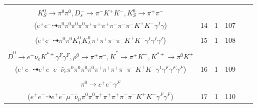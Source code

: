 \documentclass[landscape]{article}
\newcounter{rownumbers}
\newcommand\rn{\stepcounter{rownumbers}\arabic{rownumbers}}
\newcommand{\EOLP}{\\ \hline} %
\newcommand{\topoTags}[1]{#1} %
\begin{document}
\begin{longtable}{clcccc}
\rn & \makecell[l]{ $ 
e^{+} e^{-} \rightarrow \rho^{-} K^{*+} D^{+} D_{s}^{*-} \gamma^{I} ,
\rho^{-} \rightarrow \pi^{0} \pi^{-} ,
K^{*+} \rightarrow \pi^{+} K^{0} ,
D^{+} \rightarrow \pi^{0} \pi^{+} K_{S}^{0} ,
D_{s}^{*-} \rightarrow D_{s}^{-} \gamma ,
K^{0} \rightarrow K_{S}^{0} ,
$ \\ $
K_{S}^{0} \rightarrow \pi^{0} \pi^{0} ,
D_{s}^{-} \rightarrow \pi^{-} K^{+} K^{-} ,
K_{S}^{0} \rightarrow \pi^{+} \pi^{-} 
$ \\ ($
e^{+} e^{-} \dashrightarrow \pi^{0} \pi^{0} \pi^{0} \pi^{0} \pi^{+} \pi^{+} \pi^{+} \pi^{-} \pi^{-} \pi^{-} K^{+} K^{-} \gamma^{I} \gamma 
$) } & \topoTags{14 & }1 & 107 \EOLP

\rn & \makecell[l]{ $ 
e^{+} e^{-} \rightarrow \pi^{+} \pi^{-} D^{*+} D^{*-} \gamma^{I} \gamma^{I} \gamma^{I} ,
D^{*+} \rightarrow \pi^{+} D^{0} ,
D^{*-} \rightarrow \pi^{0} D^{-} ,
D^{0} \rightarrow K_{L}^{0} K^{+} K^{-} ,
D^{-} \rightarrow \pi^{0} K_{L}^{0} \pi^{-} 
$ \\ ($
e^{+} e^{-} \dashrightarrow \pi^{0} \pi^{0} K_{L}^{0} K_{L}^{0} \pi^{+} \pi^{+} \pi^{-} \pi^{-} K^{+} K^{-} \gamma^{I} \gamma^{I} \gamma^{I} 
$) } & \topoTags{15 & }1 & 108 \EOLP

\rn & \makecell[l]{ $ 
e^{+} e^{-} \rightarrow \pi^{0} \pi^{+} \rho^{-} D^{*0} \bar{D}^{*0} \gamma^{I} ,
\rho^{-} \rightarrow \pi^{0} \pi^{-} ,
D^{*0} \rightarrow \pi^{0} D^{0} ,
\bar{D}^{*0} \rightarrow \pi^{0} \bar{D}^{0} ,
D^{0} \rightarrow \rho^{0} \bar{K}^{*} ,
\pi^{0} \rightarrow e^{+} e^{-} \gamma^{F} ,
$ \\ $
\bar{D}^{0} \rightarrow e^{-} \bar{\nu}_{e} K^{*+} \gamma^{F} \gamma^{F} ,
\rho^{0} \rightarrow \pi^{+} \pi^{-} ,
\bar{K}^{*} \rightarrow \pi^{+} K^{-} ,
K^{*+} \rightarrow \pi^{0} K^{+} 
$ \\ ($
e^{+} e^{-} \dashrightarrow e^{+} e^{-} e^{-} \bar{\nu}_{e} \pi^{0} \pi^{0} \pi^{0} \pi^{0} \pi^{+} \pi^{+} \pi^{+} \pi^{-} \pi^{-} K^{+} K^{-} \gamma^{I} \gamma^{F} \gamma^{F} \gamma^{F} 
$) } & \topoTags{16 & }1 & 109 \EOLP

\rn & \makecell[l]{ $ 
e^{+} e^{-} \rightarrow \pi^{0} \pi^{+} K^{*} D^{*0} D_{s2}^{*}(2573)^{-} ,
K^{*} \rightarrow \pi^{-} K^{+} ,
D^{*0} \rightarrow \pi^{0} D^{0} ,
D_{s2}^{*}(2573)^{-} \rightarrow K^{-} \bar{D}^{0} ,
D^{0} \rightarrow \pi^{0} \pi^{+} \pi^{-} \gamma^{F} ,
\bar{D}^{0} \rightarrow \mu^{-} \bar{\nu}_{\mu} \pi^{+} ,
$ \\ $
\pi^{0} \rightarrow e^{+} e^{-} \gamma^{F} 
$ \\ ($
e^{+} e^{-} \dashrightarrow e^{+} e^{-} \mu^{-} \bar{\nu}_{\mu} \pi^{0} \pi^{0} \pi^{+} \pi^{+} \pi^{+} \pi^{-} \pi^{-} K^{+} K^{-} \gamma^{F} \gamma^{F} 
$) } & \topoTags{17 & }1 & 110 \EOLP


\end{longtable}
\end{document}
